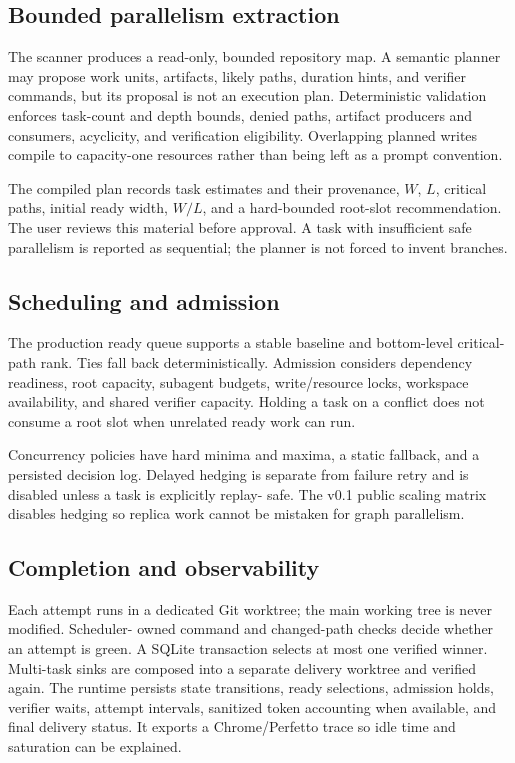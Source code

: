\documentclass[10pt,twocolumn]{article}
\begin{document}
\subsection{Bounded parallelism extraction}

The scanner produces a read-only, bounded repository map. A semantic planner may propose work
units, artifacts, likely paths, duration hints, and verifier commands, but its proposal is not an
execution plan. Deterministic validation enforces task-count and depth bounds, denied paths,
artifact producers and consumers, acyclicity, and verification eligibility. Overlapping planned
writes compile to capacity-one resources rather than being left as a prompt convention.

The compiled plan records task estimates and their provenance, $W$, $L$, critical paths, initial
ready width, $W/L$, and a hard-bounded root-slot recommendation. The user reviews this material
before approval. A task with insufficient safe parallelism is reported as sequential; the planner
is not forced to invent branches.

\subsection{Scheduling and admission}

The production ready queue supports a stable baseline and bottom-level critical-path rank. Ties
fall back deterministically. Admission considers dependency readiness, root capacity, subagent
budgets, write/resource locks, workspace availability, and shared verifier capacity. Holding a task
on a conflict does not consume a root slot when unrelated ready work can run.

Concurrency policies have hard minima and maxima, a static fallback, and a persisted decision log.
Delayed hedging is separate from failure retry and is disabled unless a task is explicitly replay-
safe. The v0.1 public scaling matrix disables hedging so replica work cannot be mistaken for graph
parallelism.

\subsection{Completion and observability}

Each attempt runs in a dedicated Git worktree; the main working tree is never modified. Scheduler-
owned command and changed-path checks decide whether an attempt is green. A SQLite transaction
selects at most one verified winner. Multi-task sinks are composed into a separate delivery
worktree and verified again. The runtime persists state transitions, ready selections, admission
holds, verifier waits, attempt intervals, sanitized token accounting when available, and final
delivery status. It exports a Chrome/Perfetto trace so idle time and saturation can be explained.
\end{document}
